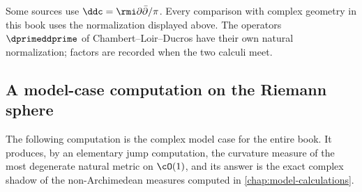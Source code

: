 \begin{remark}
\label{rem:ch01-curvature-normalization}
Some sources use $\ddc=\rmi\partial\bar\partial/\pi$.  Every comparison with
complex geometry in this book uses the normalization displayed above.  The
operators $\dprimeddprime$ of Chambert--Loir--Ducros have their own natural
normalization; factors are recorded when the two calculi meet.
\end{remark}

\subsection{A model-case computation on the Riemann sphere}
\label{sec:ch01-equilibrium}

The following computation is the complex model case for the entire book.  It
produces, by an elementary jump computation, the curvature measure of the
most degenerate natural metric on $\cO(1)$, and its answer is the exact
complex shadow of the non-Archimedean measures computed in
\cref{chap:model-calculations}.

